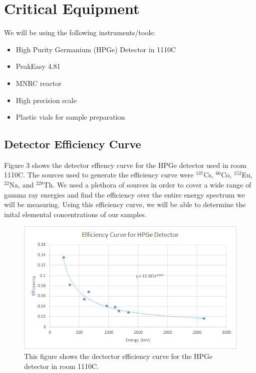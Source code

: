 \documentclass[]{article}
\begin{document}
\pagebreak

\section{Critical Equipment}
We will be using the following instruments/tools:


\begin{itemize}
\item High Purity Germanium (HPGe) Detector in 1110C
\item PeakEasy 4.81
\item MNRC reactor
\item High precision scale
\item Plastic vials for sample preparation



\end{itemize}

\subsection{Detector Efficiency Curve}

Figure 3 shows the detector effiency curve for the HPGe detector used in room 1110C. The sources used to generate the efficiency curve were $^{137}$Cs, $^{60}$Co, $^{152}$Eu, $^{22}$Na, and $^{228}$Th. We used a plethora of sources in order to cover a wide range of gamma ray energies and find the efficiency over the entire energy spectrum we will be measuring. Using this efficiency curve, we will be able to determine the inital elemental concentrations of our samples.


\begin{figure}[h]
\centering
\includegraphics[scale=0.6]{Efficiency}
\caption{This figure shows the dectector efficiency curve for the HPGe detector in room 1110C.}
\end{figure} 
\end{document}
